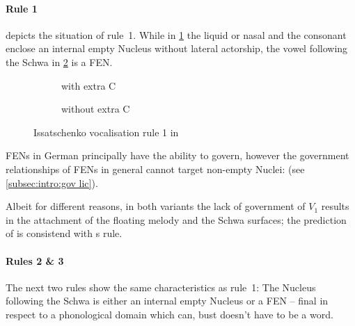 \paragraph{Rule 1}
depicts the situation of rule~1.
While in \ref{fig:issatschenko voc rule 1:L C end}
the liquid or nasal and the consonant enclose an
internal empty Nucleus without lateral actorship,
the vowel following the Schwa in
\ref{fig:issatschenko voc rule 1:L end}
is a \gls{FEN}.

\begin{figure}[h]
  \centering
  \begin{subfigure}{.49\textwidth}
    \centering
    \begin{structure}{}
      \V[floating]{\textschwa}
      \emptyV[gov]
      \fen
    \end{structure}
    \caption{with extra C}
    \label{fig:issatschenko voc rule 1:L C end}
  \end{subfigure}
  \hfill
  \begin{subfigure}{.49\textwidth}
    \centering
    \begin{structure}{}
      \V[floating]{\textschwa}
      \fen
    \end{structure}
    \caption{without extra C}
    \label{fig:issatschenko voc rule 1:L end}
  \end{subfigure}
  \caption{Issatschenko vocalisation rule 1 in \CVCV}
  \label{fig:issatschenko voc rule 1}
\end{figure}

\Glspl{FEN} in German principally have the ability
to govern, however the government relationships of
\glspl{FEN} in general cannot target
non-empty Nuclei:
 (see \cref{subsec:intro:gov lic}).

Albeit for different reasons, in both variants
the lack of government of $V_1$ results in the
attachment of the floating melody and the Schwa
surfaces; the prediction of \CVCV is consistend with
\citeauthor{issatschenko1974}s rule.

\paragraph{Rules 2 \& 3}
The next two rules show the same characteristics
as rule~1: The Nucleus following the Schwa is either
an internal empty Nucleus or a \gls{FEN}
-- final in respect to a phonological domain
which can, bust doesn't have to be a word.

